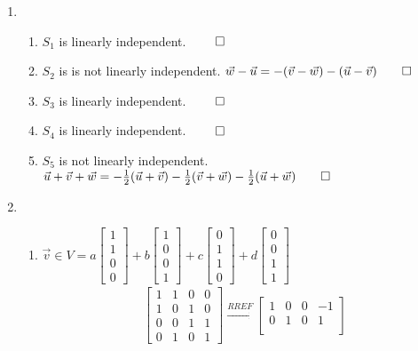 \documentclass[12pt, a4paper]{article}
\begin{document}
\begin{enumerate}[Q\arabic*.]
  \item
    \begin{enumerate}[(\alph*)]
      \item $S_1$ is linearly independent. $\qed$
      \item $S_2$ is is not linearly independent. $\vec{w} - \vec{u} = -(\vec{v} - \vec{w}) - (\vec{u} - \vec{v}) \qed$
      \item $S_3$ is linearly independent. $\qed$
      \item $S_4$ is linearly independent. $\qed$
      \item $S_5$ is not linearly independent. $\vec{u} + \vec{v} + \vec{w} = -\frac{1}{2}(\vec{u} + \vec{v}) -\frac{1}{2}(\vec{v} + \vec{w}) -\frac{1}{2}(\vec{u} + \vec{w})\qed$
    \end{enumerate}
  \pagebreak
  \item 
    \begin{enumerate}[(\alph*)]
      \item     $\vec{v} \in V = a\begin{bmatrix}1\\1\\0\\0\end{bmatrix} +  b\begin{bmatrix}1\\0\\0\\1\end{bmatrix} +  c\begin{bmatrix}0\\1\\1\\0\end{bmatrix} + d\begin{bmatrix}0\\0\\1\\1\end{bmatrix}$
        \begin{align*}
          \begin{bmatrix}
            1 & 1 & 0 & 0\\
            1 & 0 & 1 & 0\\
            0 & 0 & 1 & 1\\
            0 & 1 & 0 & 1
          \end{bmatrix} \xrightarrow{RREF}
          \begin{bmatrix}
            1 & 0 & 0 & -1\\
            0 & 1 & 0 & 1\\

\end{bmatrix}
\end{align*}
\end{enumerate}
\end{enumerate}
\end{document}
